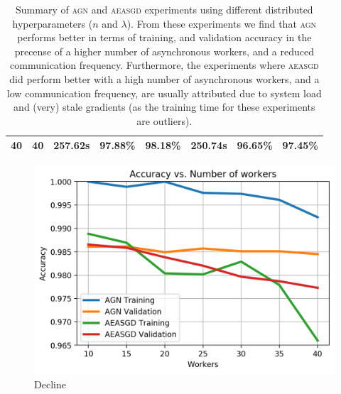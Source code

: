 \begin{table}[H]
\begin{tabular}{|c|c|c|c|c|c|c|c|}
\hline
40 & 40 & 257.62s & \textbf{97.88\%} & \textbf{98.18\%} & \textbf{250.74s} & 96.65\% & 97.45\%  \\
\hline
  \end{tabular}
  \caption{Summary of \textsc{agn} and \textsc{aeasgd} experiments using different distributed hyperparameters ($n$ and $\lambda$). From these experiments we find that \textsc{agn} performs better in terms of training, and validation accuracy in the precense of a higher number of asynchronous workers, and a reduced communication frequency. Furthermore, the experiments where \textsc{aeasgd} did perform better with a high number of asynchronous workers, and a low communication frequency, are usually attributed due to system load and (very) stale gradients (as the training time for these experiments are outliers).}
  \label{table:agn_experiments_summary}
\end{table}

\begin{figure}[H]
  \centering
  \includegraphics[width=.5\textwidth]{resources/images/agn_aeasgd_workers}
  \caption{Decline}
  \label{fig:agn_aeasgd_workers_performance_decline}
\end{figure}

